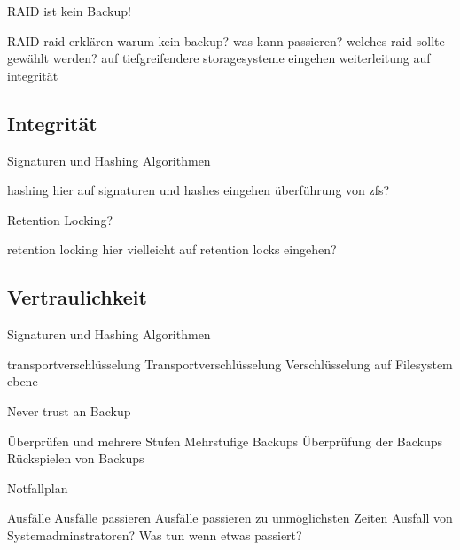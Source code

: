 \documentclass[10pt]{beamer}
\begin{document}
\begin{frame}[fragile]{RAID ist kein Backup!}
\begin{alertblock}{RAID}
	raid erklären
	warum kein backup?
	was kann passieren?
	welches raid sollte gewählt werden?
	auf tiefgreifendere storagesysteme eingehen
	weiterleitung auf integrität
\end{alertblock}
\end{frame}

\subsection{Integrität}

\begin{frame}[fragile]{Signaturen und Hashing Algorithmen}
\begin{alertblock}{hashing}
hier auf signaturen und hashes eingehen
überführung von zfs?
\end{alertblock}
\end{frame}

\begin{frame}[fragile]{Retention Locking?}
\begin{alertblock}{retention locking}
hier vielleicht auf retention locks eingehen?
\end{alertblock}
\end{frame}

\subsection{Vertraulichkeit}

\begin{frame}[fragile]{Signaturen und Hashing Algorithmen}
\begin{alertblock}{transportverschlüsselung}
Transportverschlüsselung
Verschlüsselung auf Filesystem ebene

\end{alertblock}
\end{frame}


\begin{frame}[fragile]{Never trust an Backup}
\begin{alertblock}{Überprüfen und mehrere Stufen}
	Mehrstufige Backups
	Überprüfung der Backups
	Rückspielen von Backups
\end{alertblock}
\end{frame}

\begin{frame}[fragile]{Notfallplan}
\begin{alertblock}{Ausfälle}
	Ausfälle passieren
	Ausfälle passieren zu unmöglichsten Zeiten
	Ausfall von Systemadminstratoren?
	Was tun wenn etwas passiert?
\end{alertblock}
\end{frame}
\end{document}
